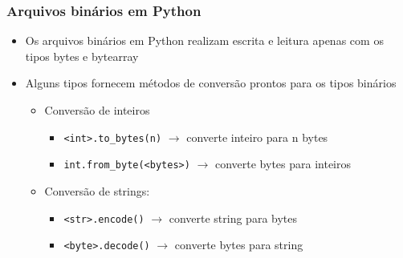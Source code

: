 \documentclass[12pt]{article}
\begin{document}
            \subsubsection{Arquivos binários em Python}
            \begin{itemize}
                \item Os arquivos binários em Python realizam escrita e leitura 
                apenas com os tipos bytes e bytearray
                \item Alguns tipos fornecem métodos de conversão prontos para 
                os tipos binários
                \begin{itemize}
                    \item Conversão de inteiros
                    \begin{itemize}
                        \item \verb|<int>.to_bytes(n)| $\rightarrow$ converte 
                        inteiro para n bytes
                        \item \verb|int.from_byte(<bytes>)| $\rightarrow$ 
                        converte bytes para inteiros
                    \end{itemize}
                    \item Conversão de strings:
                    \begin{itemize}
                        \item \verb|<str>.encode()| $\rightarrow$ converte 
                        string para bytes
                        \item \verb|<byte>.decode()| $\rightarrow$ converte 
                        bytes para string
                    \end{itemize}
                \end{itemize}
            \end{itemize}
\end{document}
